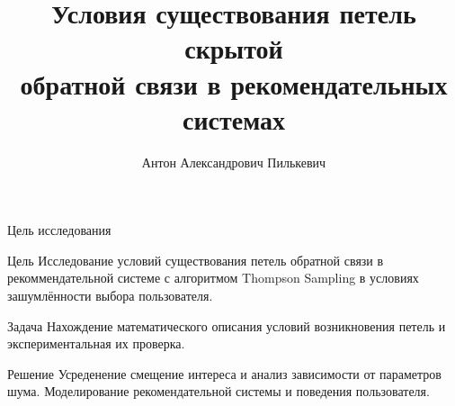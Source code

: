 \documentclass{beamer}
\title[\hbox to 56mm{Петли скрытой обратной связи}]{ Условия существования петель скрытой \\ обратной связи в рекомендательных системах }
\author[А.\,А. Пилькевич]{Антон Александрович Пилькевич}
\institute{Московский физико-технический институт}
\date{\footnotesize
\par\smallskip\emph{Курс:} Автоматизация научных исследований\par (практика, В.\,В.~Стрижов)/Группа 813
\par\smallskip\emph{Эксперт:} А.\,С.~Хританков
\par\smallskip\emph{Консультант:} А.\,С.~Хританков
\par\bigskip\small 2021}
\begin{document}
\begin{frame}
\thispagestyle{empty}
\maketitle
\end{frame}
\begin{frame}{Цель исследования}
\begin{block}{Цель}
  Исследование условий существования петель обратной
связи в рекоммендательной системе с алгоритмом Thompson Sampling в условиях зашумлённости выбора пользователя.
\end{block}
\begin{block}{Задача}
  Нахождение математического описания условий возникновения петель и экспериментальная их проверка. 
\end{block}
\begin{block}{Решение}
  Усреденение смещение интереса и анализ зависимости от параметров шума. 
  Моделирование рекомендательной системы и поведения пользователя.
\end{block}
\end{frame}
\end{document}
